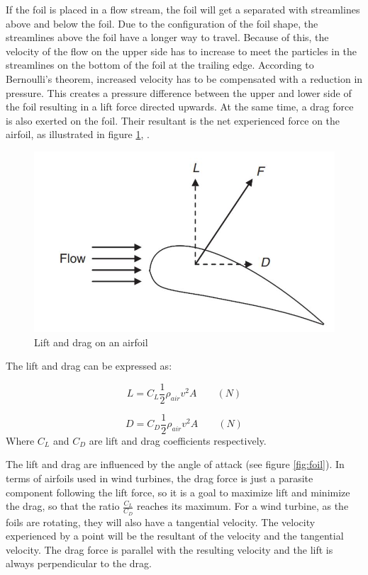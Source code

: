 \noindent If the foil is placed in a flow stream, the foil will get a separated with streamlines above and below the foil. Due to the configuration of the foil shape, the streamlines above the foil have a longer way to travel. Because of this, the velocity of the flow on the upper side has to increase to meet the particles in the streamlines on the bottom of the foil at the trailing edge. According to Bernoulli's theorem, increased velocity has to be compensated with a reduction in pressure. This creates a pressure difference between the upper and lower side of the foil resulting in a lift force directed upwards. At the same time, a drag force is also exerted on the foil. Their resultant is the net experienced force on the airfoil, as illustrated in figure \ref{fig:liftdrag}, \cite{MATHEW2012}. 

\begin{figure}[H]
\centering
\includegraphics[scale=0.6]{figures/liftdrag}
\caption[$\; \:$Lift and drag on an airfoil]{Lift and drag on an airfoil \cite{MATHEW2012} }
 \label{fig:liftdrag}
\end{figure}

 \noindent The lift and drag can be expressed as:

 \begin{equation}
    L = C_L\frac{1}{2}\rho_{air} v^2 A \qquad (N)
\end{equation}

\begin{equation}
    D = C_D\frac{1}{2}\rho_{air} v^2 A \qquad (N)
\end{equation}
Where $C_L$ and $C_D$ are lift and drag coefficients respectively.\newline 
\newline

\noindent The lift and drag are influenced by the angle of attack (see figure \ref{fig:foil}). In terms of airfoils used in wind turbines, the drag force is just a parasite component following the lift force, so it is a goal to maximize lift and minimize the drag, so that the ratio $\frac{C_L}{C_D}$ reaches its maximum. For a wind turbine, as the foils are rotating, they will also have a tangential velocity. The velocity experienced by a point will be the resultant of the velocity and the tangential velocity. The drag force is parallel with the resulting velocity and the lift is always perpendicular to the drag. 

